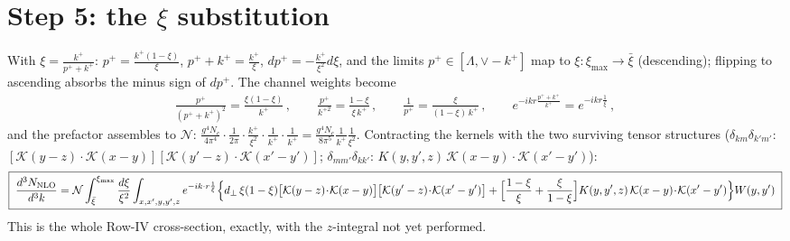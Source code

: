 \documentclass[9pt]{article}
\newcommand{\KK}{\mathcal K(x-y)\!\cdot\!\mathcal K(x'-y')}
\begin{document}
\section{Step 5: the $\xi$ substitution}
With $\xi=\frac{k^{+}}{p^{+}+k^{+}}$: $p^{+}=\frac{k^{+}(1-\xi)}{\xi}$,
$p^{+}+k^{+}=\frac{k^{+}}{\xi}$, $dp^{+}=-\frac{k^{+}}{\xi^{2}}d\xi$, and the limits
$p^{+}\in[\Lambda,\vee-k^{+}]$ map to $\xi:\xi_{\max}\to\bar\xi$ (descending); flipping to
ascending absorbs the minus sign of $dp^{+}$. The channel weights become
\begin{align}
\frac{p^{+}}{(p^{+}+k^{+})^{2}}=\frac{\xi(1-\xi)}{k^{+}}\,,\qquad
\frac{p^{+}}{k^{+2}}=\frac{1-\xi}{\xi\,k^{+}}\,,\qquad
\frac{1}{p^{+}}=\frac{\xi}{(1-\xi)\,k^{+}}\,,\qquad
e^{-ikr\frac{p^{+}+k^{+}}{k^{+}}}=e^{-ikr\frac{1}{\xi}}\,,
\end{align}
and the prefactor assembles to $\mathcal N$:
$\frac{g^{4}N_{c}}{4\pi^{4}}\cdot\frac{1}{2\pi}\cdot\frac{k^{+}}{\xi^{2}}\cdot\frac{1}{k^{+}}\cdot\frac{1}{k^{+}}
=\frac{g^{4}N_{c}}{8\pi^{5}}\frac{1}{k^{+}}\frac{1}{\xi^{2}}$. Contracting the kernels with
the two surviving tensor structures
($\delta_{km}\delta_{k'm'}$: $[\mathcal K(y-z)\!\cdot\!\mathcal K(x-y)][\mathcal K(y'-z)\!\cdot\!\mathcal K(x'-y')]$;
$\delta_{mm'}\delta_{kk'}$: $K(y,y',z)\,\KK$):
\begin{align}\label{eq:xiform}
\boxed{\;\frac{d^{3}N_{\rm NLO}}{d^{3}k}
=\mathcal N
\int_{\bar\xi}^{\xi_{\max}}\frac{d\xi}{\xi^{2}}
\int_{x,x',y,y',z} e^{-ik\cdot r\frac{1}{\xi}}
\Big\{d_{\perp}\,\xi(1-\xi)\big[\mathcal K(y-z)\!\cdot\!\mathcal K(x-y)\big]\big[\mathcal K(y'-z)\!\cdot\!\mathcal K(x'-y')\big]
+\Big[\frac{1-\xi}{\xi}+\frac{\xi}{1-\xi}\Big]K(y,y',z)\,\KK\Big\}W(y,y')\;}
\end{align}
This is the whole Row-IV cross-section, exactly, with the $z$-integral not yet performed.
\end{document}
